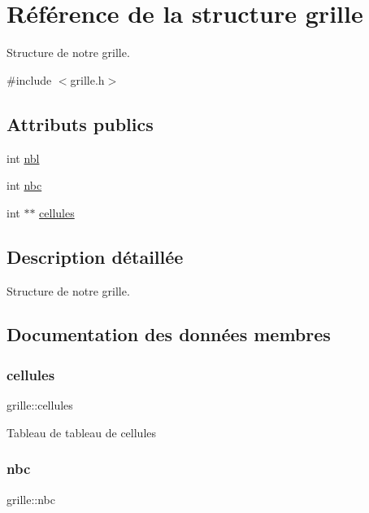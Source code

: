 \hypertarget{structgrille}{}\section{Référence de la structure grille}
\label{structgrille}


Structure de notre grille.  




{\ttfamily \#include $<$grille.\+h$>$}

\subsection*{Attributs publics}
\begin{DoxyCompactItemize}
\item 
int \hyperlink{structgrille_a038d466056834f499a729c71bc8024d2}{nbl}
\item 
int \hyperlink{structgrille_af013ee523177eefb9832b6d17c136ffc}{nbc}
\item 
int $\ast$$\ast$ \hyperlink{structgrille_a1440104f7d501c3175ab4b1db2413d0b}{cellules}
\end{DoxyCompactItemize}


\subsection{Description détaillée}
Structure de notre grille. 

\subsection{Documentation des données membres}
\mbox{\label{structgrille_a1440104f7d501c3175ab4b1db2413d0b}} 
\subsubsection{\texorpdfstring{cellules}{cellules}}
{\footnotesize\ttfamily grille\+::cellules}

Tableau de tableau de cellules \mbox{\label{structgrille_af013ee523177eefb9832b6d17c136ffc}} 
\subsubsection{\texorpdfstring{nbc}{nbc}}
{\footnotesize\ttfamily grille\+::nbc}

